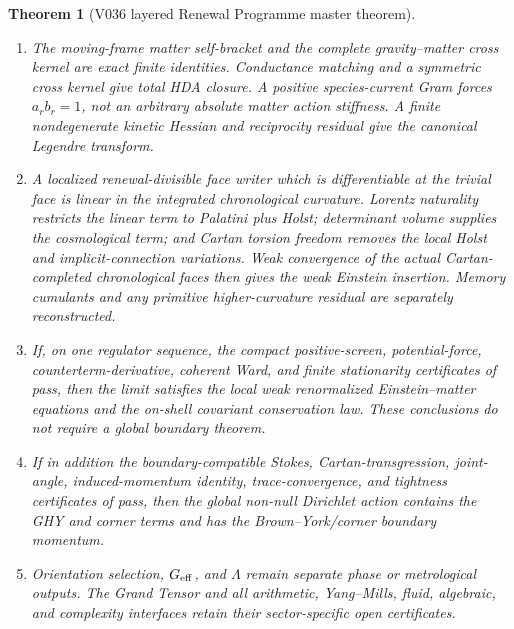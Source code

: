 \documentclass[11pt]{article}
\newtheorem{theorem}{Theorem}[section]
\theoremstyle{definition}
\theoremstyle{remark}
\begin{document}
\begin{theorem}[V036 layered Renewal Programme master theorem]
\begin{enumerate}[label=\textup{(\Roman*)},leftmargin=3em]
      cyclic reduction give the normal--normal HDA bracket with unit
      coefficient.  Coherent endpoint-flow semidirect naturality gives the
      normal--tangential bracket.  The tangential--tangential bracket follows
      from Jacobi and a scalar normal-history commutant, or from a strict
      coherent group-law pass.  Hence the complete vacuum HDA is a theorem in
      this finite coherent branch, not a further continuum axiom.
\item The moving-frame matter self-bracket and the complete
      gravity--matter cross kernel are exact finite identities.  Conductance
      matching and a symmetric cross kernel give total HDA closure.  A
      positive species-current Gram forces
      \(a_rb_r=1\), not an arbitrary absolute matter action stiffness.
      A finite nondegenerate kinetic Hessian and reciprocity residual give the
      canonical Legendre transform.
\item A localized renewal-divisible face writer which is differentiable at the
      trivial face is linear in the integrated chronological curvature.
      Lorentz naturality restricts the linear term to Palatini plus Holst;
      determinant volume supplies the cosmological term; and Cartan torsion
      freedom removes the local Holst and implicit-connection variations.
      Weak convergence of the actual Cartan-completed chronological faces then
      gives the weak Einstein insertion.  Memory cumulants and any primitive
      higher-curvature residual are separately reconstructed.
\item If, on one regulator sequence, the compact positive-screen,
      potential-force, counterterm-derivative, coherent Ward, and finite
      stationarity certificates of 
      pass, then the limit satisfies the local weak renormalized
      Einstein--matter equations and the on-shell covariant conservation law.
      These conclusions do not require a global boundary theorem.
\item If in addition the boundary-compatible Stokes, Cartan-transgression,
      joint-angle, induced-momentum identity, trace-convergence, and tightness
      certificates of  pass, then the
      global non-null Dirichlet action contains the GHY and corner terms and
      has the Brown--York/corner boundary momentum.
\item Orientation selection, \(G_{\rm eff}\), and \(\Lambda\) remain separate
      phase or metrological outputs.  The Grand Tensor and all arithmetic,
      Yang--Mills, fluid, algebraic, and complexity interfaces retain their
      sector-specific open certificates.
\end{enumerate}
\end{theorem}
\end{document}
